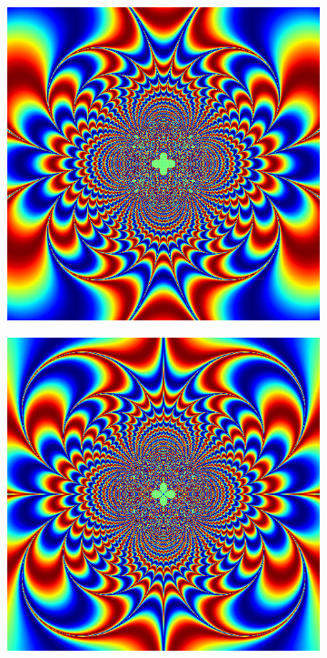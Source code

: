 \begin{figure}
\begin{subfigure}{.32\textwidth}
\includegraphics[width=\textwidth]{exp_inv2_real.png}
\end{subfigure}
\begin{subfigure}{.32\textwidth}
\includegraphics[width=\textwidth]{exp_inv2_imag.png}

\end{subfigure}
\end{figure}
